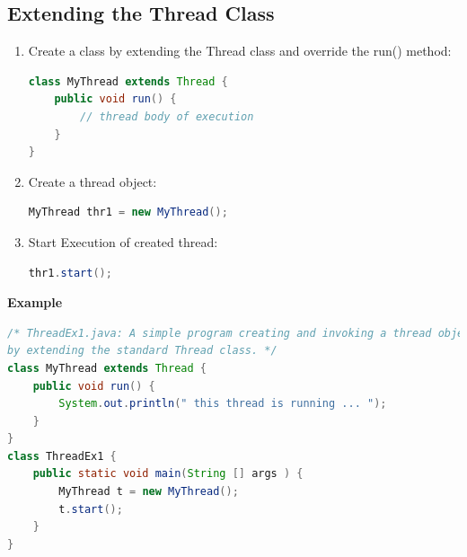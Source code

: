 \documentclass[12pt, a4paper]{book}
\begin{document}
\subsection{Extending the Thread Class}
\begin{enumerate}
    \item  Create a class by extending the Thread class and override the run() method:
          \begin{lstlisting}[language=java]
class MyThread extends Thread {
    public void run() {
	    // thread body of execution
    }
}
    \end{lstlisting}
    \item Create a thread object:
          \begin{lstlisting}[language=java]
MyThread thr1 = new MyThread();
    \end{lstlisting}
    \item Start Execution of created thread: \begin{lstlisting}[language=java]
thr1.start();
    \end{lstlisting}
\end{enumerate}
\textbf{Example} \\
\begin{lstlisting}[language=java]
/* ThreadEx1.java: A simple program creating and invoking a thread object
by extending the standard Thread class. */
class MyThread extends Thread {
    public void run() {
        System.out.println(" this thread is running ... ");
    }
}
class ThreadEx1 {
    public static void main(String [] args ) {
        MyThread t = new MyThread();
        t.start();
    }
}
\end{lstlisting}
\end{document}
